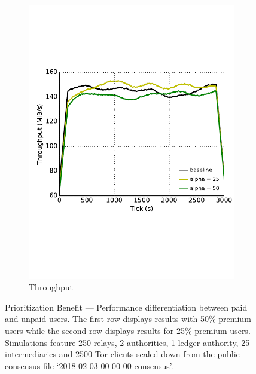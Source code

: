 \begin{figure}
\begin{subfigure}[t]{0.32\textwidth}
\includegraphics[trim={0 3cm 0 3cm}, clip, width=1.0\textwidth]{images/modifier_pr25_all.pdf}
		\caption{Throughput}
\label{fig:modifier_pr25_all}
	\end{subfigure}
	\caption{Prioritization Benefit --- Performance differentiation between
          paid and unpaid users. The first row displays results with 50\%
          premium users while the second row displays results for 25\% premium
          users. Simulations feature 250 relays, 2 authorities, 1 ledger
          authority, 25 intermediaries and 2500 Tor clients scaled down from the
          public consensus file `2018-02-03-00-00-00-consensus'.}
\label{fig:modifier}
\end{figure}

